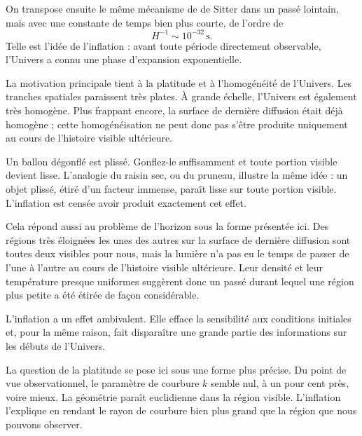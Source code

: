 On transpose ensuite le même mécanisme de de Sitter dans un passé lointain, mais avec une constante de temps bien plus courte, de l’ordre de
\begin{equation}
H^{-1}\sim 10^{-32}\,\mathrm{s}.
\end{equation}
Telle est l’idée de l’inflation : avant toute période directement observable, l’Univers a connu une phase d’expansion exponentielle.

La motivation principale tient à la platitude et à l’homogénéité de l’Univers. Les tranches spatiales paraissent très plates. À grande échelle, l’Univers est également très homogène. Plus frappant encore, la surface de dernière diffusion était déjà homogène ; cette homogénéisation ne peut donc pas s’être produite uniquement au cours de l’histoire visible ultérieure.

Un ballon dégonflé est plissé. Gonflez-le suffisamment et toute portion visible devient lisse. L’analogie du raisin sec, ou du pruneau, illustre la même idée : un objet plissé, étiré d’un facteur immense, paraît lisse sur toute portion visible. L’inflation est censée avoir produit exactement cet effet.

Cela répond aussi au problème de l’horizon sous la forme présentée ici. Des régions très éloignées les unes des autres sur la surface de dernière diffusion sont toutes deux visibles pour nous, mais la lumière n’a pas eu le temps de passer de l’une à l’autre au cours de l’histoire visible ultérieure. Leur densité et leur température presque uniformes suggèrent donc un passé durant lequel une région plus petite a été étirée de façon considérable.

L’inflation a un effet ambivalent. Elle efface la sensibilité aux conditions initiales et, pour la même raison, fait disparaître une grande partie des informations sur les débuts de l’Univers.

La question de la platitude se pose ici sous une forme plus précise. Du point de vue observationnel, le paramètre de courbure \(k\) semble nul, à un pour cent près, voire mieux. La géométrie paraît euclidienne dans la région visible. L’inflation l’explique en rendant le rayon de courbure bien plus grand que la région que nous pouvons observer.

\begin{classroomqa}
\end{classroomqa}

